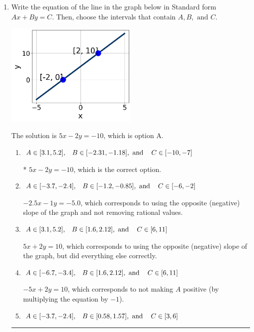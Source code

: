 \documentclass{extbook}[14pt]
\newcommand{\litem}[1]{\item #1

\rule{\textwidth}{0.4pt}}
\begin{document}
\begin{enumerate}\litem{
Write the equation of the line in the graph below in Standard form $Ax+By=C$. Then, choose the intervals that contain $A, B, \text{ and } C$.

\begin{center}
    \includegraphics[width=0.5\textwidth]{../Figures/linearGraphToStandardCopyB.png}
\end{center}


The solution is \( 5x - 2y = -10 \), which is option A.\begin{enumerate}[label=\Alph*.]
\item \( A \in [3.1, 5.2], \hspace{3mm} B \in [-2.31, -1.18], \text{ and } \hspace{3mm} C \in [-10, -7] \)

* $5x - 2y = -10$, which is the correct option.
\item \( A \in [-3.7, -2.4], \hspace{3mm} B \in [-1.2, -0.85], \text{ and } \hspace{3mm} C \in [-6, -2] \)

 $-2.5x - 1y = -5.0$, which corresponds to using the opposite (negative) slope of the graph and not removing rational values.
\item \( A \in [3.1, 5.2], \hspace{3mm} B \in [1.6, 2.12], \text{ and } \hspace{3mm} C \in [6, 11] \)

 $5x + 2y = 10$, which corresponds to using the opposite (negative) slope of the graph, but did everything else correctly.
\item \( A \in [-6.7, -3.4], \hspace{3mm} B \in [1.6, 2.12], \text{ and } \hspace{3mm} C \in [6, 11] \)

 $-5x + 2y = 10$, which corresponds to not making $A$ positive (by multiplying the equation by $-1$).
\item \( A \in [-3.7, -2.4], \hspace{3mm} B \in [0.58, 1.57], \text{ and } \hspace{3mm} C \in [3, 6] \)


\end{enumerate}}
\end{enumerate}
\end{document}
